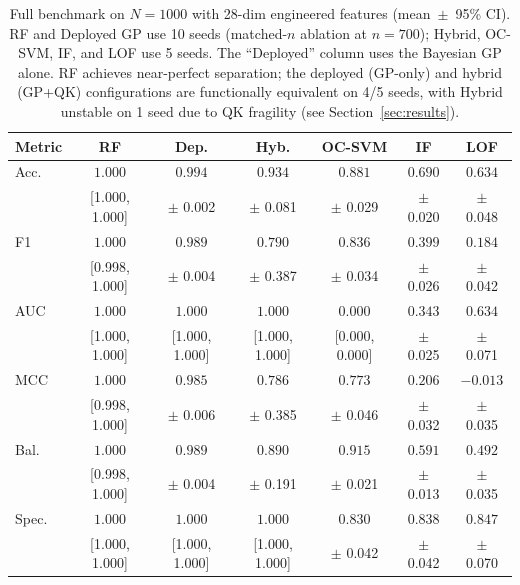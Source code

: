 \documentclass[conference,10pt]{IEEEtran}
\begin{document}
\begin{table}[t]
  \centering
  \caption{Full benchmark on $N=1000$ with 28-dim engineered features (mean~$\pm$~95\% CI). RF and Deployed GP use 10 seeds (matched-$n$ ablation at $n = 700$); Hybrid, OC-SVM, IF, and LOF use 5 seeds. The ``Deployed'' column uses the Bayesian GP alone. RF achieves near-perfect separation; the deployed (GP-only) and hybrid (GP+QK) configurations are functionally equivalent on 4/5 seeds, with Hybrid unstable on 1 seed due to QK fragility (see Section~\ref{sec:results}).}
  \label{tab:benchmark}
  \scriptsize
  \setlength{\tabcolsep}{2.0pt}
  \begin{tabular}{lcccccc}
    \toprule
    \textbf{Metric} & \textbf{RF} & \textbf{Dep.} & \textbf{Hyb.} & \textbf{OC-SVM} & \textbf{IF} & \textbf{LOF} \\
    \midrule
    Acc.  & $\mathbf{1.000}$ & $0.994$ & $0.934$ & $0.881$ & $0.690$ & $0.634$ \\
          & {\scriptsize [1.000, 1.000]} & {\scriptsize $\pm$ 0.002} & {\scriptsize $\pm$ 0.081} & {\scriptsize $\pm$ 0.029} & {\scriptsize $\pm$ 0.020} & {\scriptsize $\pm$ 0.048} \\
    F1    & $\mathbf{1.000}$ & $0.989$ & $0.790$ & $0.836$ & $0.399$ & $0.184$ \\
          & {\scriptsize [0.998, 1.000]} & {\scriptsize $\pm$ 0.004} & {\scriptsize $\pm$ 0.387} & {\scriptsize $\pm$ 0.034} & {\scriptsize $\pm$ 0.026} & {\scriptsize $\pm$ 0.042} \\
    AUC   & $\mathbf{1.000}$ & $\mathbf{1.000}$ & $\mathbf{1.000}$ & $0.000$ & $0.343$ & $0.634$ \\
          & {\scriptsize [1.000, 1.000]} & {\scriptsize [1.000, 1.000]} & {\scriptsize [1.000, 1.000]} & {\scriptsize [0.000, 0.000]} & {\scriptsize $\pm$ 0.025} & {\scriptsize $\pm$ 0.071} \\
    MCC   & $\mathbf{1.000}$ & $0.985$ & $0.786$ & $0.773$ & $0.206$ & $-0.013$ \\
          & {\scriptsize [0.998, 1.000]} & {\scriptsize $\pm$ 0.006} & {\scriptsize $\pm$ 0.385} & {\scriptsize $\pm$ 0.046} & {\scriptsize $\pm$ 0.032} & {\scriptsize $\pm$ 0.035} \\
    Bal.  & $\mathbf{1.000}$ & $0.989$ & $0.890$ & $0.915$ & $0.591$ & $0.492$ \\
          & {\scriptsize [0.998, 1.000]} & {\scriptsize $\pm$ 0.004} & {\scriptsize $\pm$ 0.191} & {\scriptsize $\pm$ 0.021} & {\scriptsize $\pm$ 0.013} & {\scriptsize $\pm$ 0.035} \\
    Spec. & $\mathbf{1.000}$ & $\mathbf{1.000}$ & $\mathbf{1.000}$ & $0.830$ & $0.838$ & $0.847$ \\
          & {\scriptsize [1.000, 1.000]} & {\scriptsize [1.000, 1.000]} & {\scriptsize [1.000, 1.000]} & {\scriptsize $\pm$ 0.042} & {\scriptsize $\pm$ 0.042} & {\scriptsize $\pm$ 0.070} \\
    \bottomrule
  \end{tabular}
\end{table}
\end{document}
